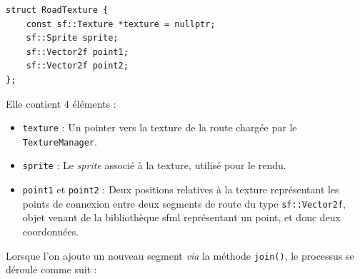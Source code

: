 \begin{lstlisting}[style=CStyle,label={lst:struct_roadtexture}]
struct RoadTexture {
    const sf::Texture *texture = nullptr;
    sf::Sprite sprite;
    sf::Vector2f point1;
    sf::Vector2f point2;
};
\end{lstlisting}

Elle contient 4 éléments :
\begin{itemize}
    \item \texttt{texture} : Un \gls{pointer} vers la texture de la route chargée par le \texttt{TextureManager}.
    \item \texttt{\gls{sprite}} : Le \textit{\gls{sprite}} associé à la texture, utilisé pour le rendu.
    \item \texttt{point1} et \texttt{point2} : Deux positions relatives à la texture représentant les points de connexion entre deux segments de route du type \texttt{sf::Vector2f}, objet venant de la bibliothèque \gls{sfml} représentant un point, et donc deux coordonnées.
\end{itemize}

Lorsque l'on ajoute un nouveau segment \textit{via} la méthode \texttt{join()}, le processus se déroule comme suit :

